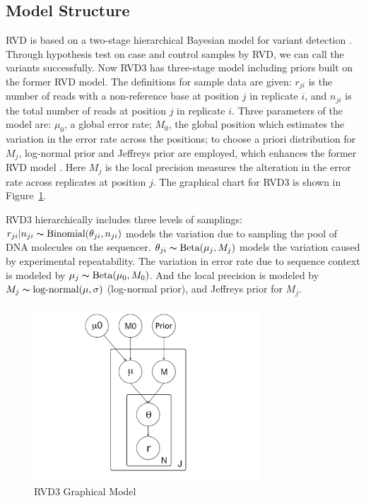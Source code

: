\documentclass[11pt,reqno]{amsart}
\begin{document}
\subsection{Model Structure}\label{sec:model_structure}
RVD is based on a two-stage hierarchical Bayesian model for variant detection \citep{Flaherty:2011ja}. Through hypothesis test on case and control samples by RVD, we can call the variants successfully.
Now RVD3 has three-stage model including priors built on the former RVD model.
The definitions for sample data are given: $r_{ji}$ is the number of reads with a non-reference base at position $j$ in replicate $i$, and $n_{ji}$ is the total number of reads at position $j$ in replicate $i$.
Three parameters of the model are: $\mu_0$, a global error rate; $M_0$, the global position which estimates the variation in the error rate across the positions;
to choose a priori distribution for $M_j$, log-normal prior and Jeffreys prior \citep{jeffreys1946invariant} are employed, which enhances the former RVD model \citep{Flaherty:2011ja}.
Here $M_j$ is the local precision measures the alteration in the error rate across replicates at position $j$. The graphical chart for RVD3 is shown in Figure~\ref{fig:graphical_model}.

RVD3 hierarchically includes three levels of samplings: $r_{ji} | n_{ji} \thicksim \text{Binomial}(\theta_{ji}, n_{ji})$ models the variation due to sampling the pool of DNA molecules on the sequencer.
$\theta_{ji} \thicksim \text{Beta}(\mu_j, M_j)$ models the variation caused by experimental repeatability. The variation in error rate due to sequence context is modeled by $\mu_j \thicksim \text{Beta}(\mu_0, M_0)$.
And the local precision is modeled by $ M_{j} \thicksim \text{log-normal}(\mu, \sigma)$ (log-normal prior), and Jeffreys prior for $M_j$.

\begin{figure}[h]
\begin{center}
\includegraphics[width=85mm]{figs/RVD3_model.pdf}
\caption{RVD3 Graphical Model}
\label{fig:graphical_model}
\end{center}
\end{figure}
\end{document}
